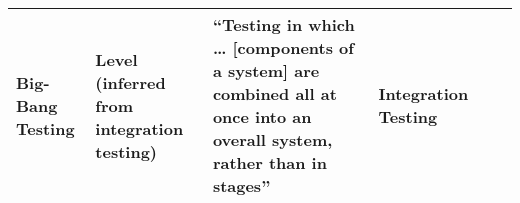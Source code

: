 \begin{table}[hbtp!]
\begin{tabularx}{\linewidth}{|m{1.7cm}|m{3cm}|X|m{3.2cm}|m{2.4cm}|X|}
        Big-Bang Testing         & Level (inferred from integration testing)                                                                    & ``Testing in which \dots{} [components of a system] are combined all at once into an overall system, rather than in stages'' \citep[p.~45]{IEEE2017} & Integration Testing \citetext{\citealp[p.~45]{IEEE2017}; \citealp[p.~5-7]{SWEBOK2024}; \citealp[p.~603]{SharmaEtAl2021}; \citealp[p.~42]{Kam2008}} &                                               &                                                                                                                                                                                                                           \\
        \hline
    \end{tabularx}
\end{table}